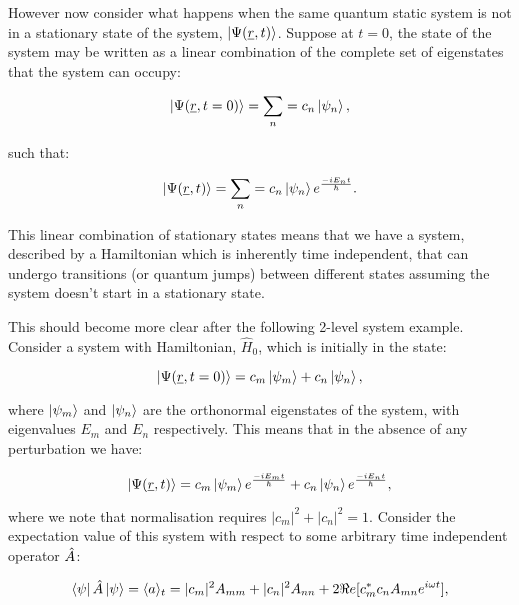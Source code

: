 \noindent However now consider what happens when the same quantum static system is not in a stationary state of the system, $\ket{\Psi(\underline{r}, t)}$. Suppose at $t = 0$, the state of the system may be written as a linear combination of the complete set of eigenstates that the system can occupy:

\begin{equation}
    \ket{\Psi(\underline{r}, t = 0)} = \sum_n = c_n \ket{\psi_n},
    \label{LinearCombinationStatesNonStationaryNoTimeDependence}
\end{equation}

\noindent such that:

\begin{equation}
    \ket{\Psi(\underline{r}, t)} = \sum_n = c_n \ket{\psi_n} e^\frac{-i E_n t}{\hbar}.
    \label{LinearCombinationStatesNonStationaryTimeDependence}
\end{equation}

\noindent This linear combination of stationary states means that we have a system, described by a Hamiltonian which is inherently time independent, that can undergo transitions (or quantum jumps) between different states assuming the system doesn't start in a stationary state.

\noindent This should become more clear after the following 2-level system example. Consider a system with Hamiltonian, $\hat{H}_0$, which is initially in the state:

\begin{equation}
    \ket{\Psi(\underline{r}, t = 0)} = c_m \ket{\psi_m} + c_n \ket{\psi_n},
    \label{TwoLevelSystemInitialState}
\end{equation}

\noindent where $\ket{\psi_m}$ and $\ket{\psi_n}$ are the orthonormal eigenstates of the system, with eigenvalues $E_m$ and $E_n$ respectively. This means that in the absence of any perturbation we have:

\begin{equation}
    \ket{\Psi(\underline{r}, t)} = c_m \ket{\psi_m} e^\frac{-i E_m t}{\hbar} + c_n \ket{\psi_n} e^\frac{-i E_n t}{\hbar},
    \label{TwoLevelSystemGeneralState}
\end{equation}

\noindent where we note that normalisation requires $|c_m|^2 + |c_n|^2 = 1$. Consider the expectation value of this system with respect to some arbitrary time independent operator $\Hat{A}$:

\begin{equation}
    \bra{\psi}\Hat{A}\ket{\psi} = \langle a \rangle _t = |c_m|^2 A_{mm} + |c_n|^2 A_{nn} + 2 \Re e[c_m^* c_n A_{mn} e^{i\omega t}],
    \label{TwoLevelSystemExpectationValue}
\end{equation}

